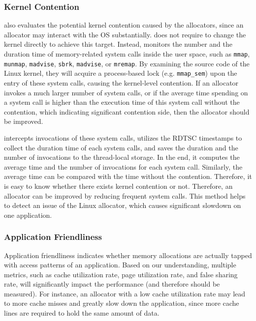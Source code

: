 \subsubsection{Kernel Contention}
\MP{} also evaluates the potential kernel contention caused by the allocators, since an allocator may interact with the OS substantially. \MP{} does not require to change the kernel directly to achieve this target. Instead, \MP{} monitors the number and the duration time of memory-related system calls inside the user space, such as \texttt{mmap}, \texttt{munmap}, \texttt{madvise}, \texttt{sbrk}, \texttt{madvise}, or \texttt{mremap}. By examining the source code of the Linux kernel, they will acquire a process-based lock (e.g. \texttt{mmap\_sem}) upon the entry of these system calls, causing the kernel-level contention. If an allocator invokes a much larger number of system calls, or if the average time spending on a system call is higher than the execution time of this system call without the contention, which indicating significant contention side, then the allocator should be improved. 

\MP{} intercepts invocations of these system calls, utilizes the RDTSC timestamps to collect the duration time of each system calls, and saves the duration and the number of invocations to the thread-local storage. In the end, it computes the average time and the number of invocations for each system call. Similarly, the average time can be compared with the time without the contention. Therefore, it is easy to know whether there exists kernel contention or not. Therefore, an allocator can be improved by reducing frequent system calls. This method helps to detect an issue of the Linux allocator, which causes significant slowdown on one application. 

 


\subsubsection{Application Friendliness}
\label{sec: friendliness}

Application friendliness indicates whether memory allocations are actually tapped with access patterns of an application. Based on our understanding, multiple metrics, such as cache utilization rate, page utilization rate, and false sharing rate, will significantly impact the performance (and therefore should be measured). For instance, an allocator with a low cache utilization rate may lead to more cache misses and greatly slow down the application, since more cache lines are required to hold the same amount of data. 

